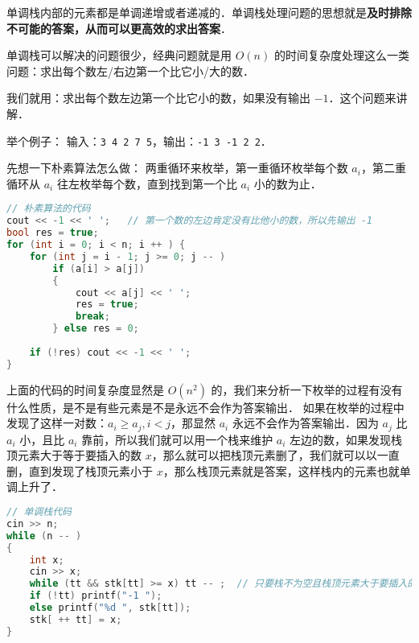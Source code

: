

单调栈内部的元素都是单调递增或者递减的．单调栈处理问题的思想就是\textbf{及时排除不可能的答案，从而可以更高效的求出答案}．

单调栈可以解决的问题很少，经典问题就是用 $O(n)$ 的时间复杂度处理这么一类问题：求出每个数左/右边第一个比它小/大的数．

我们就用：求出每个数左边第一个比它小的数，如果没有输出 $-1$．这个问题来讲解．

举个例子：
输入：\verb|3 4 2 7 5|，输出：\verb|-1 3 -1 2 2|．

先想一下朴素算法怎么做：
两重循环来枚举，第一重循环枚举每个数 $a_i$，第二重循环从 $a_i$ 往左枚举每个数，直到找到第一个比 $a_i$ 小的数为止．

\begin{lstlisting}[language=cpp]
// 朴素算法的代码
cout << -1 << ' ';   // 第一个数的左边肯定没有比他小的数，所以先输出 -1
bool res = true;
for (int i = 0; i < n; i ++ ) {
    for (int j = i - 1; j >= 0; j -- )
        if (a[i] > a[j])
        {
            cout << a[j] << ' ';
            res = true;
            break;
        } else res = 0;
    
    if (!res) cout << -1 << ' ';
}
\end{lstlisting}

上面的代码的时间复杂度显然是 $O(n^2)$ 的，我们来分析一下枚举的过程有没有什么性质，是不是有些元素是不是永远不会作为答案输出．
如果在枚举的过程中发现了这样一对数：$a_i \geqslant a_j, i < j$，那显然 $a_i$ 永远不会作为答案输出．因为 $a_j$ 比 $a_i$ 小，且比 $a_i$ 靠前，所以我们就可以用一个栈来维护 $a_i$ 左边的数，如果发现栈顶元素大于等于要插入的数 $x$，那么就可以把栈顶元素删了，我们就可以以一直删，直到发现了栈顶元素小于 $x$，那么栈顶元素就是答案，这样栈内的元素也就单调上升了．

\begin{lstlisting}[language=cpp]
// 单调栈代码
cin >> n;
while (n -- )
{
    int x;
    cin >> x;
    while (tt && stk[tt] >= x) tt -- ;  // 只要栈不为空且栈顶元素大于要插入的数 x，那么就删除栈顶元素
    if (!tt) printf("-1 ");
    else printf("%d ", stk[tt]);
    stk[ ++ tt] = x;
}
\end{lstlisting}